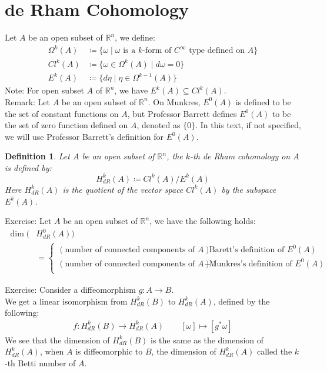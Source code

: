 \documentclass[15pt]{book}
\theoremstyle{break}
\theoremstyle{break}
\newtheorem{defn}{Definition}[corL]
\newcommand{\R}{\mathbb{R}}
\newcommand{\note}{\color{red}Note: \color{black}}
\newcommand{\remark}{\color{blue}Remark: \color{black}}
\newcommand{\exercise}{\color{green}Exercise: \color{black}}
\begin{document}
\section[de Rham Cohomology]{\color{red} de Rham Cohomology\color{black}}
Let $A$ be an open subset of $\R^n$, we define: 
\begin{align*}
\Omega^k(A) &\coloneqq \{\omega \mid \omega\text{ is a }k\text{-form of }C^\infty \text{ type defined on }A\}\\
Cl^k(A) &\coloneqq \{\omega \in \Omega^k(A) \mid d\omega = 0 \}\\
E^k(A) &\coloneqq \{ d\eta \mid \eta \in \Omega^{k-1}(A) \}
\end{align*}
\note For open subset $A$ of $\R^n$, we have $E^k(A) \subseteq Cl^k(A)$.\\

\remark Let $A$ be an open subset of $\R^n$. On Munkres, $E^0(A)$ is defined to be the set of constant functions on $A$, but Professor Barrett defines $E^0(A)$ to be the set of zero function defined on $A$, denoted as $\{0\}$. In this text, if not specified, we will use Professor Barrett's definition for $E^0(A)$. 

\begin{defn}
Let $A$ be an open subset of $\R^n$, the $k$-th de Rham cohomology on $A$ is defined by:
$$H^k_{dR}(A)\coloneqq Cl^k(A)/ E^k(A)$$
Here $H^k_{dR}(A)$ is the quotient of the vector space $Cl^k(A)$ by the subspace $ E^k(A)$. 
\end{defn}

\exercise Let $A$ be an open subset of $\R^n$, we have the following holds:
\begin{align*}
\dim(&H^0_{dR}(A)) \\
&= \begin{cases}
(\text{number of connected components of }A) & \text{Barett's definition of }E^0(A) \\
(\text{number of connected components of }A)-1 & \text{Munkres's definition of }E^0(A) \\
\end{cases}
\end{align*}

\exercise Consider a diffeomorphism $g:A \to B$.\\
We get a linear isomorphism from $H_{dR}^k(B)$ to $H_{dR}^k(A)$, defined by the following:
\begin{align*}
f:H_{dR}^k(B)\to H_{dR}^k(A)\qquad [\omega]\mapsto [g^*\omega]
\end{align*}
We see that the dimension of $H_{dR}^k(B)$ is the same as the dimension of $H_{dR}^k(A)$, when $A$ is diffeomorphic to $B$, the dimension of $H_{dR}^k(A)$ called the $k$-th Betti number of $A$.\\
\end{document}
